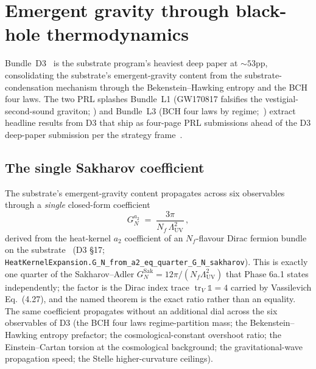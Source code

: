 \documentclass[aps,prd,reprint,nofootinbib,superscriptaddress]{revtex4-2}
\begin{document}

\section{Emergent gravity through black-hole thermodynamics}
\label{sec:emergent-gravity}

Bundle~D3~\cite{Roehm2026D3} is the substrate program's heaviest deep
paper at $\sim 53$pp, consolidating the substrate's emergent-gravity
content from the substrate-condensation mechanism through the
Bekenstein--Hawking entropy and the BCH four laws. The two PRL
splashes Bundle~L1 (GW170817 falsifies the vestigial-second-sound
graviton; \cite{Abbott2017GW170817}) and Bundle~L3 (BCH four laws
by regime;~\cite{BardeenCarterHawking1973}) extract headline
results from D3 that ship as four-page PRL submissions ahead of the
D3 deep-paper submission per the strategy frame~\cite{Roehm2026Strategy}.

\subsection{The single Sakharov coefficient}

The substrate's emergent-gravity content propagates across six
observables through a \emph{single} closed-form coefficient
\begin{equation}
  G_N^{a_2} \;=\; \frac{3\pi}{N_f\,\Lambda_{\mathrm{UV}}^{2}}\,,
\end{equation}
derived from the heat-kernel $a_2$ coefficient of an $N_f$-flavour
Dirac fermion bundle on the substrate~\cite{Sakharov1968,Adler1980,
Vassilevich2003} (D3 \S 17;
\texttt{HeatKernelExpansion.G\_N\_from\_a2\_eq\_quarter\_G\_N\_sakharov}).
This is exactly one quarter of the Sakharov--Adler
$G_N^{\mathrm{Sak}} = 12\pi/(N_f\Lambda_{\mathrm{UV}}^{2})$ that Phase
6a.1 states independently; the factor is the Dirac index trace
$\operatorname{tr}_V\mathbb{1} = 4$ carried by Vassilevich Eq.~(4.27),
and the named theorem is the exact ratio rather than an equality. The
same coefficient propagates without an additional dial across the six
observables of D3 (the BCH four
laws regime-partition mass; the Bekenstein--Hawking entropy
prefactor; the cosmological-constant overshoot ratio; the
Einstein--Cartan torsion at the cosmological background; the
gravitational-wave propagation speed; the Stelle higher-curvature
ceilings).
\end{document}
